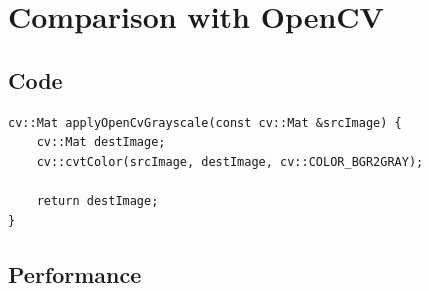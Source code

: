 \section{Comparison with OpenCV}

\subsection{Code}

\begin{listing}[H]
    \begin{verbatim}
cv::Mat applyOpenCvGrayscale(const cv::Mat &srcImage) {
    cv::Mat destImage;
    cv::cvtColor(srcImage, destImage, cv::COLOR_BGR2GRAY);

    return destImage;
}
    \end{verbatim}
    \label{listing:grayscale_opencv}
\end{listing}

\subsection{Performance}


